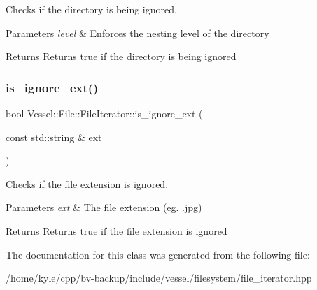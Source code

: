 Checks if the directory is being ignored. 


\begin{DoxyParams}{Parameters}
{\em level} & Enforces the nesting level of the directory \\
\hline
\end{DoxyParams}
\begin{DoxyReturn}{Returns}
Returns true if the directory is being ignored 
\end{DoxyReturn}
\mbox{\label{class_vessel_1_1_file_1_1_file_iterator_a6f285e42ac14fcb265d72299131b1ffe}} 
\subsubsection{\texorpdfstring{is\+\_\+ignore\+\_\+ext()}{is\_ignore\_ext()}}
{\footnotesize\ttfamily bool Vessel\+::\+File\+::\+File\+Iterator\+::is\+\_\+ignore\+\_\+ext (\begin{DoxyParamCaption}\item[{const std\+::string \&}]{ext }\end{DoxyParamCaption})}



Checks if the file extension is ignored. 


\begin{DoxyParams}{Parameters}
{\em ext} & The file extension (eg. .jpg) \\
\hline
\end{DoxyParams}
\begin{DoxyReturn}{Returns}
Returns true if the file extension is ignored 
\end{DoxyReturn}


The documentation for this class was generated from the following file\+:\begin{DoxyCompactItemize}
\item 
/home/kyle/cpp/bv-\/backup/include/vessel/filesystem/file\+\_\+iterator.\+hpp\end{DoxyCompactItemize}
